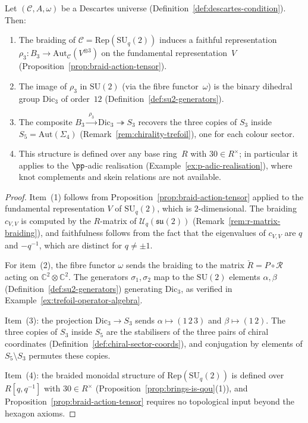 \begin{corollary}
\label{cor:descartes-braid-structure}
Let $(\mathcal{C}, A, \omega)$ be a Descartes universe
(Definition~\ref{def:descartes-condition}).  Then:
\begin{enumerate}
  \item The braiding of $\mathcal{C} = \mathrm{Rep}(\mathrm{SU}_q(2))$
        induces a faithful representation
        $\rho_3\colon B_3 \to \mathrm{Aut}_{\mathcal{C}}(V^{\otimes 3})$
        on the fundamental representation~$V$
        (Proposition~\ref{prop:braid-action-tensor}).
  \item The image of $\rho_3$ in $\mathrm{SU}(2)$ (via the fibre
        functor~$\omega$) is the binary dihedral group
        $\mathrm{Dic}_3$ of order~$12$
        (Definition~\ref{def:su2-generators}).
  \item The composite $B_3 \xrightarrow{\;\rho_3\;}
        \mathrm{Dic}_3 \twoheadrightarrow S_3$ recovers the three
        copies of $S_3$ inside $S_5 = \mathrm{Aut}(\Sigma_4)$
        (Remark~\ref{rem:chirality-trefoil}), one for each
        colour sector.
  \item This structure is defined over any base ring~$R$ with
        $30 \in R^{\times}$; in particular it applies to the
        $\pp$-adic realisation
        (Example~\ref{ex:p-adic-realisation}), where knot complements
        and skein relations are not available.
\end{enumerate}
\end{corollary}

\begin{proof}
Item~(1) follows from Proposition~\ref{prop:braid-action-tensor}
applied to the fundamental representation $V$ of
$\mathrm{SU}_q(2)$, which is $2$-dimensional.  The braiding
$c_{V,V}$ is computed by the $R$-matrix of
$\mathcal{U}_q(\mathfrak{su}(2))$
(Remark~\ref{rem:r-matrix-braiding}), and faithfulness follows from the
fact that the eigenvalues of $c_{V,V}$ are $q$ and $-q^{-1}$, which
are distinct for $q \neq \pm 1$.

For item~(2), the fibre functor $\omega$ sends the braiding to the
matrix $\check{R} = P \circ \mathcal{R}$ acting on
$\mathbb{C}^2 \otimes \mathbb{C}^2$.  The generators $\sigma_1, \sigma_2$
map to the $\mathrm{SU}(2)$ elements $\alpha, \beta$
(Definition~\ref{def:su2-generators}) generating $\mathrm{Dic}_3$, as
verified in Example~\ref{ex:trefoil-operator-algebra}.

Item~(3): the projection $\mathrm{Dic}_3 \to S_3$ sends
$\alpha \mapsto (1\,2\,3)$ and $\beta \mapsto (1\,2)$.  The three
copies of $S_3$ inside $S_5$ are the stabilisers of the three pairs
of chiral coordinates
(Definition~\ref{def:chiral-sector-coords}), and conjugation by
elements of $S_5 \setminus S_3$ permutes these copies.

Item~(4): the braided monoidal structure of
$\mathrm{Rep}(\mathrm{SU}_q(2))$ is defined over~$R[q, q^{-1}]$
with $30 \in R^{\times}$
(Proposition~\ref{prop:brings-is-qou}(1)), and
Proposition~\ref{prop:braid-action-tensor} requires no topological
input beyond the hexagon axioms.
\end{proof}

